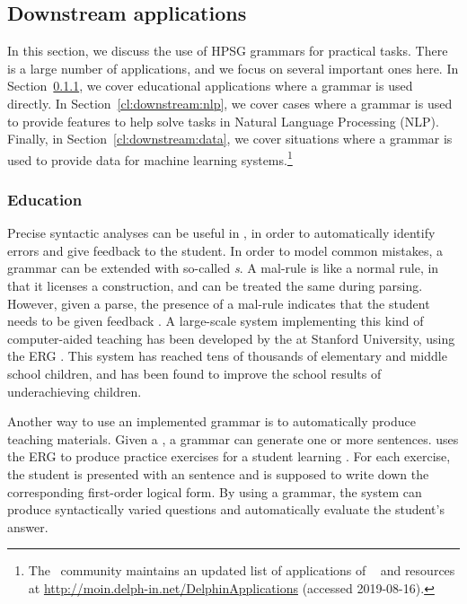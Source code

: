 \documentclass[output=paper,biblatex,babelshorthands,newtxmath,draftmode,colorlinks,citecolor=brown]{langscibook}
\begin{document}
\subsection{Downstream applications}
\label{cl:downstream}

\largerpage
%
In this section, we discuss the use of HPSG grammars for practical tasks.  There is a large number
of applications, and we focus on several important ones here.  In Section~\ref{cl:downstream:edu},
we cover educational applications where a grammar is used directly.  In
Section~\ref{cl:downstream:nlp}, we cover cases where a grammar is used to provide features to help
solve tasks in Natural Language Processing (NLP).  Finally, in Section~\ref{cl:downstream:data}, we
cover situations where a grammar is used to provide data for machine learning systems.\footnote{The
  \delphin\ community maintains an updated list of applications of \delphin\  and
  resources at \url{http://moin.delph-in.net/DelphinApplications} (accessed 2019-08-16).}



\subsubsection{Education}
\label{cl:downstream:edu}

%
Precise syntactic analyses can be useful in ,
in order to automatically identify errors and give feedback to the student.
In order to model common mistakes,
a grammar can be extended with so-called \textit{s}.
A mal-rule is like a normal rule, in that it licenses a construction,
and can be treated the same during parsing. However, given a parse,
the presence of a mal-rule indicates that the student needs to be given feedback
\citep{Ben:Fli:Oep:04,flickinger2013error,morgadodacosta2016error}.
A large-scale system implementing this kind of computer-aided teaching has been developed
by the  at Stanford University,
using the ERG \citep{suppes2014teach}.
This system has reached tens of thousands of elementary and middle school children,
and has been found to improve the school results of underachieving children.

Another way to use an implemented grammar is to automatically produce teaching materials.  Given a , a grammar can generate one or more sentences.  \citet{Flickinger:17} uses the ERG to produce practice exercises for a student learning .  For each exercise, the student is presented with an  sentence and is supposed to write down the corresponding first-order logical form. By using a grammar, the system can produce syntactically varied questions and automatically evaluate the student's answer.%
\end{document}
